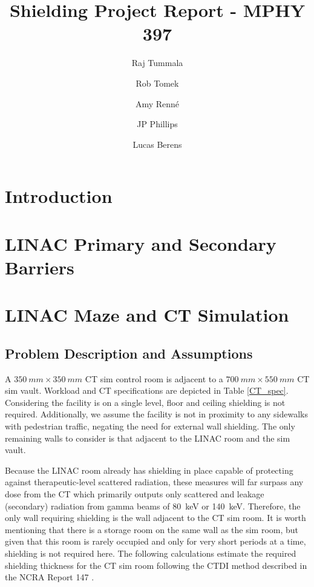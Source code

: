\documentclass[%
aps,
mph,%
amsmath,amssymb,
preprint,%
tightenlines,
longbibliography,
superscriptaddress,
floatfix,
nofootinbib,
]{revtex4-2}
\begin{document}
\title{Shielding Project Report - MPHY 397}


\author{Raj Tummala}

\author{Rob Tomek}

\author{Amy Renn\'{e}}

\author{JP Phillips}

\author{Lucas Berens}

\maketitle


\section{Introduction}
\section{LINAC Primary and Secondary Barriers}
\section{LINAC Maze and CT Simulation}
    \subsection{Problem Description and Assumptions}
        A $\SI{350}{mm} \times \SI{350}{mm}$ CT sim control room is adjacent to a $\SI{700}{mm} \times \SI{550}{mm}$ CT sim vault. Workload and CT specifications are depicted in Table \ref{CT_spec}. Considering the facility is on a single level, floor and ceiling shielding is not required. Additionally, we assume the facility is not in proximity to any sidewalks with pedestrian traffic, negating the need for external wall shielding. The only remaining walls to consider is that adjacent to the LINAC room and the sim vault.
        
        Because the LINAC room already has shielding in place capable of protecting against therapeutic-level scattered radiation, these measures will far surpass any dose from the CT which primarily outputs only scattered and leakage (secondary) radiation from gamma beams of \SI{80}{keV} or \SI{140}{keV}. Therefore, the only wall requiring shielding is the wall adjacent to the CT sim room. It is worth mentioning that there is a storage room on the same wall as the sim room, but given that this room is rarely occupied and only for very short periods at a time, shielding is not required here. The following calculations estimate the required shielding thickness for the CT sim room following the CTDI method described in the NCRA Report 147 \cite{national2004ncrp}. 
\end{document}
